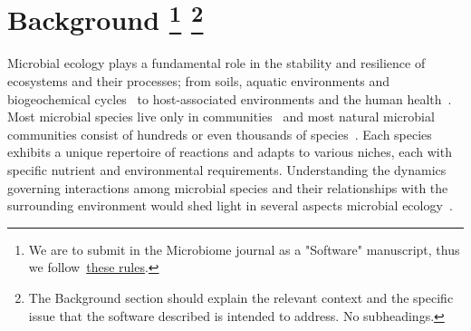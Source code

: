 \documentclass[sn-mathphys,Numbered]{sn-jnl}  %
\theoremstyle{thmstyleone}%
\theoremstyle{thmstyletwo}%
\theoremstyle{thmstylethree}%
\begin{document}


\section*{Background
\footnote{
We are to submit in the Microbiome journal as a "Software" manuscript, thus we follow~\href{https://microbiomejournal.biomedcentral.com/submission-guidelines/preparing-your-manuscript/software-article}{these rules}.
}
\footnote{
The Background section should explain the relevant context and the specific issue that the software described is intended to address.
No subheadings.
}
}
\label{sec:background}

    Microbial ecology plays a fundamental role in the stability and resilience of ecosystems and their processes; from soils, aquatic environments and biogeochemical cycles~\cite{yuan2021climate} to host-associated environments and the human health~\cite{raes2008molecular, faust2012microbialReviewInteractions}.
    Most microbial species live only in communities~\cite{rottjers2018hairballs} and most natural microbial communities consist of hundreds or even thousands of species~\cite{balint2016millions}.
    Each species exhibits a unique repertoire of reactions and adapts to various niches, each with specific nutrient and environmental requirements.
    Understanding the dynamics governing interactions among microbial species and their relationships with the surrounding environment would shed light in several aspects microbial ecology~\cite{robinson2010structure}.
\end{document}
